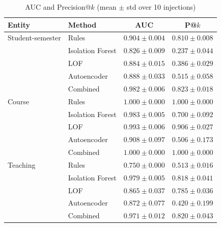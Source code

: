 \documentclass[conference]{IEEEtran}
\begin{document}
\begin{table}[htbp]
\caption{AUC and Precision@$k$ (mean $\pm$ std over 10 injections)}
\begin{center}
\footnotesize\setlength{\tabcolsep}{3pt}
\begin{tabular}{llcc}
\toprule
\textbf{Entity} & \textbf{Method} & \textbf{AUC} & \textbf{P@$k$} \\
\midrule
Student-semester & Rules & $0.904\pm0.004$ & $0.810\pm0.008$ \\
 & Isolation Forest & $0.826\pm0.009$ & $0.237\pm0.044$ \\
 & LOF & $0.884\pm0.015$ & $0.386\pm0.029$ \\
 & Autoencoder & $0.888\pm0.033$ & $0.515\pm0.058$ \\
 & Combined & $0.982\pm0.006$ & $0.823\pm0.018$ \\
\midrule
Course & Rules & $1.000\pm0.000$ & $1.000\pm0.000$ \\
 & Isolation Forest & $0.983\pm0.005$ & $0.700\pm0.092$ \\
 & LOF & $0.993\pm0.006$ & $0.906\pm0.027$ \\
 & Autoencoder & $0.908\pm0.097$ & $0.506\pm0.173$ \\
 & Combined & $1.000\pm0.000$ & $1.000\pm0.000$ \\
\midrule
Teaching & Rules & $0.750\pm0.000$ & $0.513\pm0.016$ \\
 & Isolation Forest & $0.979\pm0.005$ & $0.818\pm0.041$ \\
 & LOF & $0.865\pm0.037$ & $0.785\pm0.036$ \\
 & Autoencoder & $0.872\pm0.077$ & $0.420\pm0.199$ \\
 & Combined & $0.971\pm0.012$ & $0.820\pm0.043$ \\
\bottomrule
\end{tabular}
\label{tab:auc}
\end{center}
\end{table}
\end{document}
